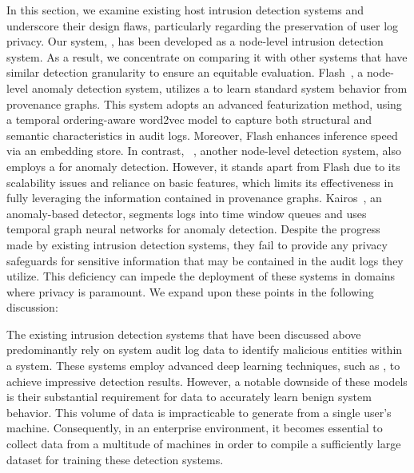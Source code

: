 

In this section, we examine existing host intrusion detection systems and underscore their design flaws, particularly regarding the preservation of user log privacy. Our system, \Sys, has been developed as a node-level intrusion detection system. As a result, we concentrate on comparing it with other systems that have similar detection granularity to ensure an equitable evaluation. Flash~\cite{flash2024}, a node-level anomaly detection system, utilizes a \gnn to learn standard system behavior from provenance graphs. This system adopts an advanced featurization method, using a temporal ordering-aware word2vec model to capture both structural and semantic characteristics in audit logs. Moreover, Flash enhances inference speed via an \gnnshort embedding store. In contrast, \threatrace~\cite{wang2022threatrace}, another node-level detection system, also employs a \gnn for anomaly detection. However, it stands apart from Flash due to its scalability issues and reliance on basic features, which limits its effectiveness in fully leveraging the information contained in provenance graphs. Kairos~\cite{cheng2023kairos}, an anomaly-based detector, segments logs into time window queues and uses temporal graph neural networks for anomaly detection. Despite the progress made by existing intrusion detection systems, they fail to provide any privacy safeguards for sensitive information that may be contained in the audit logs they utilize. This deficiency can impede the deployment of these systems in domains where privacy is paramount. We expand upon these points in the following discussion: 

 The existing intrusion detection systems that have been discussed above predominantly rely on system audit log data to identify malicious entities within a system. These systems employ advanced deep learning techniques, such as \gnn, to achieve impressive detection results. However, a notable downside of these models is their substantial requirement for data to accurately learn benign system behavior. This volume of data is impracticable to generate from a single user's machine. Consequently, in an enterprise environment, it becomes essential to collect data from a multitude of machines in order to compile a sufficiently large dataset for training these detection systems. 


